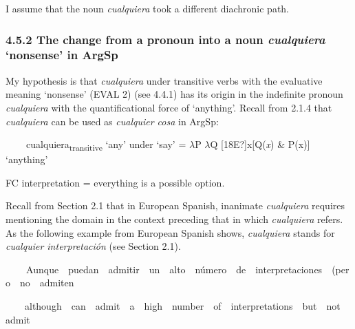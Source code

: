 \begin{styleStandard}
I assume that the noun \textit{cualquiera} took a different diachronic path. 
\end{styleStandard}

\subsubsection[4.5.2 The change from a pronoun into a noun cualquiera ‘nonsense’ in ArgSp]{\textbf{4.5.2 }\textbf{The change from a pronoun into a noun }\textbf{\textit{cualquiera}}\textbf{ ‘nonsense’ in ArgSp}}
\begin{styleStandard}
My hypothesis is that \textit{cualquiera} under transitive verbs with the evaluative meaning ‘nonsense’ (EVAL 2) (see 4.4.1) has its origin in the indefinite pronoun \textit{cualquiera} with the quantificational force of ‘anything’. Recall from 2.1.4 that \textit{cualquiera} can be used as \textit{cualquier cosa} in ArgSp: 
\end{styleStandard}

\begin{styleStandard}
\textbf{\ \ }\ \ cualquiera\textsubscript{transitive} ‘any’ under ‘say’ = $\lambda $P $\lambda $Q [18E?]x[Q(\textit{x}) \& P(x)] ‘anything’ 
\end{styleStandard}

\begin{styleStandard}
FC interpretation = everything is a possible option.
\end{styleStandard}

\begin{styleStandard}
Recall from Section 2.1 that in European Spanish, inanimate \textit{cualquiera} requires mentioning the domain in the context preceding that in which \textit{cualquiera} refers. As the following example from European Spanish shows, \textit{cualquiera} stands for \textit{cualquier interpretación} (see Section 2.1).
\end{styleStandard}

\begin{styleStandard}
\textbf{\ \ }\ \ Aunque\ \ puedan\ \ admitir\ \ un\ \ alto\ \ número\ \ de\ \ interpretaciones\ \ (pero\ \ no\ \ admiten
\end{styleStandard}

\begin{styleStandard}
\ \ \ \ although\ \ can\ \ admit\ \ a\ \ high\ \ number\ \ of\ \ interpretations\ \ but\ \ not\ \ admit
\end{styleStandard}

